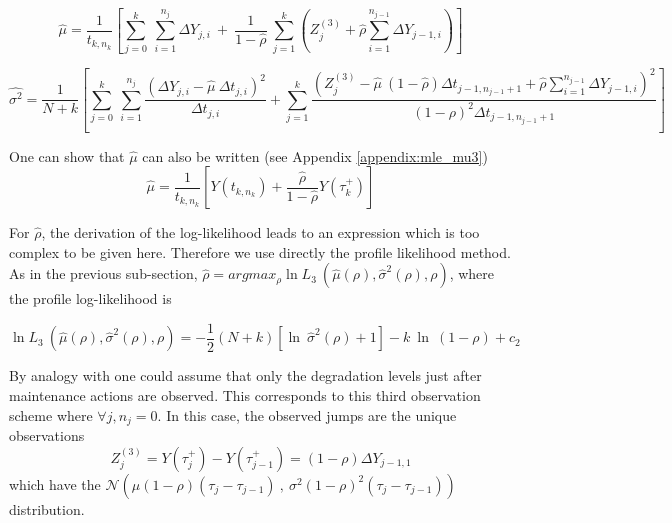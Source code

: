 \begin{equation}
\hat{\mu} = \frac{1}{t_{k,n_{k}}} \left[ \sum\limits_{j=0}^{k}\ \sum\limits_{i=1}^{n_j}\Delta Y_{j,i}\ +\ \frac{1}{1-\hat{\rho}}\ \sum\limits_{j=1}^{k} \left(Z_j^{(3)}+\hat{\rho} \sum \limits_{i=1}^{n_{j-1}}\Delta Y_{j-1,i}\right)\right]
\label{eq:mle_mu3}
\end{equation}


\begin{equation}
\hat{\sigma^2} =\frac{1}{N+k} \left[\sum\limits_{j=0}^{k}\ \sum\limits_{i=1}^{n_j} \frac{(\Delta Y_{j,i}-\hat{\mu}\ \Delta t_{j,i})^2}{\Delta t_{j,i}}
+ \sum\limits_{j=1}^{k} \frac{\left(Z_j^{(3)}-\hat{\mu}\ (1-\hat{\rho})\Delta t_{j-1,n_{j-1}+1}+\hat{\rho} \sum \limits_{i=1}^{n_{j-1}}\Delta Y_{j-1,i}\right)^2}{(1-\rho)^2 \Delta t_{j-1,n_{j-1}+1}}\right]
\end{equation}

\noindent One can show that $\hat\mu$ can also be written (see Appendix \ref{appendix:mle_mu3})
$$ \hat\mu=\frac{1}{t_{k,n_k}} \left[Y(t_{k,n_k})+\frac{\hat\rho}{1-\hat\rho}Y(\tau_k^+)\right]$$

For $\hat{\rho}$, the derivation of the log-likelihood leads to an expression which is too complex to be given here. Therefore we use directly the profile likelihood method.
As in the previous sub-section, $\hat\rho=argmax_{\rho} \ln L_3\ (\hat{\mu}(\rho),\hat{\sigma}^2(\rho),\rho)$, where the profile log-likelihood is 

\begin{equation}
\ln L_3\ (\hat{\mu}(\rho),\hat{\sigma}^2(\rho),\rho) = -\frac{1}{2} (N+k) \left[ \ln\ \hat{\sigma}^2(\rho) +1 \right]- k\ \ln\ (1-\rho) + c_2 
\end{equation}

\vspace{3 mm}

By analogy with \cite{salles_semiparametric_2020, kamranfar_inference_2021} one could assume that only the degradation levels just after maintenance actions are observed. This corresponds to this third observation scheme where $\forall j, n_j=0$.
In this case, the observed jumps are the unique observations 
$$Z_j^{(3)} = Y(\tau_j^+) - Y(\tau_{j-1}^+) = (1-\rho) \Delta Y_{j-1,1}$$
\label{eq:logp3}
\noindent which have the $\mathcal{N}\left(\mu (1-\rho) (\tau_j - \tau_{j-1})\ ,\ \sigma^2 (1-\rho)^2 (\tau_j - \tau_{j-1})\right)$ distribution.

